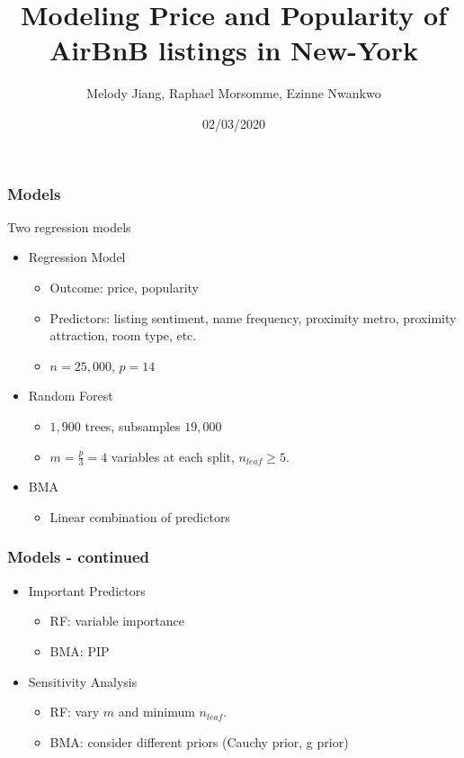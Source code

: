 \documentclass{beamer}
\title{Modeling Price and Popularity of AirBnB listings in New-York}
\author{Melody Jiang, Raphael Morsomme, Ezinne Nwankwo}
\institute{Department of Statistical Science, Duke University}
\date{02/03/2020}
\begin{document}
\frame{\titlepage}




\begin{frame}
\frametitle{Models}
Two regression models
\begin{itemize}
	\item Regression Model
	\begin{itemize}
		\item Outcome: price, popularity
		\item Predictors: listing sentiment, name frequency, proximity metro, proximity attraction, room type, etc.
		\item $n = 25,000$, $p=14$
	\end{itemize}
	\item Random Forest
	\begin{itemize}
		\item $1,900$ trees, subsamples $19,000$
		\item $m=\frac{p}{3}=4$ variables at each split, $n_{leaf} \ge 5$.
	\end{itemize}
	\item BMA
	\begin{itemize}
		\item Linear combination of predictors
	\end{itemize}
\end{itemize}
\end{frame}



\begin{frame}
\frametitle{Models - continued}
\begin{itemize}
	\item Important Predictors
	\begin{itemize}
		\item RF: variable importance
		
		\item BMA: PIP
	\end{itemize}
	\item Sensitivity Analysis
	\begin{itemize}
		\item RF: vary $m$ and minimum $n_{leaf}$.
		\item BMA: consider different priors (Cauchy prior, g prior)
	\end{itemize}
\end{itemize}

\end{frame}
\end{document}

